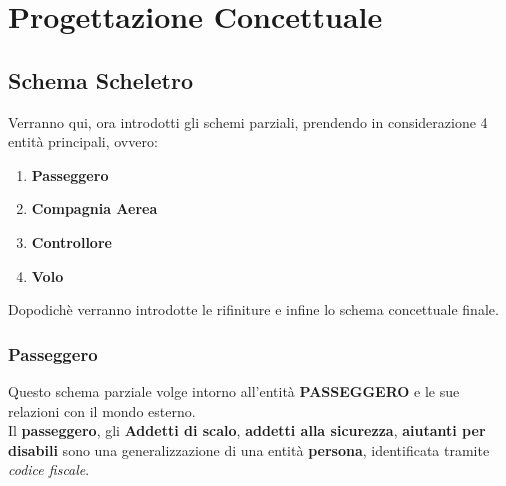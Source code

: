 
\newpage

\section{Progettazione Concettuale}

\subsection{Schema Scheletro}

\textsf{\small Verranno qui, ora introdotti gli schemi parziali, prendendo in considerazione 4 entità principali, ovvero: }
\begin{enumerate}
	\item \textbf{Passeggero}
	\item \textbf{Compagnia Aerea}
	\item \textbf{Controllore}
	\item \textbf{Volo}
\end{enumerate}

\textsf{\small Dopodichè verranno introdotte le rifiniture e infine lo schema concettuale finale.}\\ %


\enlargethispage{1\linewidth}

\subsubsection{Passeggero}

\textsf{\small Questo schema parziale volge intorno all'entità \textbf{PASSEGGERO} e le sue relazioni con il mondo esterno.}\\ %

\textsf{\small Il \textbf{passeggero}, gli \textbf{Addetti di scalo}, \textbf{addetti alla sicurezza}, \textbf{aiutanti per disabili} sono una generalizzazione di una entità \textbf{persona}, identificata tramite \emph{codice fiscale}.}\\ %

